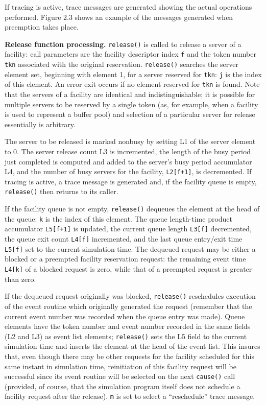 If tracing is active, trace messages are generated showing the actual
operations performed. Figure 2.3 shows an example of the messages
generated when preemption takes place.

\textbf{Release function processing.} \texttt{release()} is called to release a server of a
facility: call parameters are the facility descriptor index \texttt{f} and the token
number \texttt{tkn} associated with the original reservation. \texttt{release()} searches
the server element set, beginning with element 1, for a server reserved for
\texttt{tkn}: \texttt{j} is the index of this element. An error exit occurs if no element
reserved for \texttt{tkn} is found. Note that the servers of a facility are identical
and indistinguishable; it is possible for multiple servers to be reserved by a
single token (as, for example, when a facility is used to represent a buffer
pool) and selection of a particular server for release essentially is arbitrary.

The server to be released is marked nonbusy by setting L1 of the server
element to 0. The server release count L3 is incremented, the length of the
busy period just completed is computed and added to the server's busy period
accumulator L4, and the number of busy servers for the facility, \texttt{L2[f+1]}, is
decremented. If tracing is active, a trace message is generated and, if the
facility queue is empty, \texttt{release()} then returns to its caller.

If the facility queue is not empty, \texttt{release()} dequeues the element at
the head of the queue: \texttt{k} is the index of this element. The queue length-time
product accumulator \texttt{L5[f+1]} is updated, the current queue length \texttt{L3[f]}
decremented, the queue exit count \texttt{L4[f]} incremented, and the last queue
entry/exit time \texttt{L5[f]} set to the current simulation time. The dequeued
request may be either a blocked or a preempted facility reservation request:
the remaining event time \texttt{L4[k]} of a blocked request is zero, while that of a
preempted request is greater than zero.

If the dequeued request originally was blocked, \texttt{release()} reschedules
execution of the event routine which originally generated the request
(remember that the current event number was recorded when the queue entry
was made). Queue elements have the token number and event number
recorded in the same fields (L2 and L3) as event list elements; \texttt{release()}
sets the L5 field to the current simulation time and inserts the element at the
head of the event list. This insures that, even though there may be other
requests for the facility scheduled for this same instant in simulation time,
reinitiation of this facility request will be successful since its event routine
will be selected on the next \texttt{cause()} call (provided, of course, that the simulation
program itself does not schedule a facility request after the release).
\texttt{m} is set to select a ``reschedule'' trace message.

